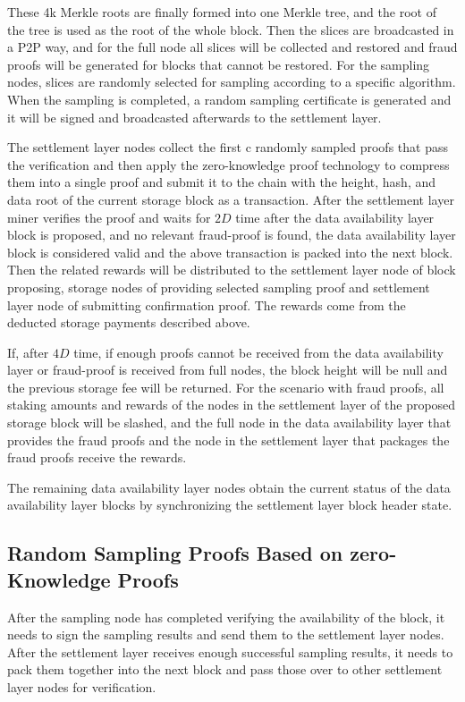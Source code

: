 \documentclass{iacrtrans}
\begin{document}
These 4k Merkle roots are finally formed into one Merkle tree, and the root of the tree is used as the root of the whole block. Then the slices are broadcasted in a P2P way, and for the full node all slices will be collected and restored and fraud proofs will be generated for blocks that cannot be restored. For the sampling nodes, slices are randomly selected for sampling according to a specific algorithm. When the sampling is completed, a random sampling certificate is generated and it will be signed and broadcasted afterwards to the settlement layer.

The settlement layer nodes collect the first c randomly sampled proofs that pass the verification and then apply the zero-knowledge proof technology to compress them into a single proof and submit it to the chain with the height, hash, and data root of the current storage block as a transaction. After the settlement layer miner verifies the proof and waits for $2D$ time after the data availability layer block is proposed, and no relevant fraud-proof is found, the data availability layer block is considered valid and the above transaction is packed into the next block. Then the related rewards will be distributed to the settlement layer node of block proposing, storage nodes of providing selected sampling proof and settlement layer node of submitting confirmation proof. The rewards come from the deducted storage payments described above. 

If, after $4D$ time, if enough proofs cannot be received from the data availability layer or fraud-proof is received from full nodes, the block height will be null and the previous storage fee will be returned. For the scenario with fraud proofs, all staking amounts and rewards of the nodes in the settlement layer of the proposed storage block will be slashed, and the full node in the data availability layer that provides the fraud proofs and the node in the settlement layer that packages the fraud proofs receive the rewards.

The remaining data availability layer nodes obtain the current status of the data availability layer blocks by synchronizing the settlement layer block header state.


\subsection{Random Sampling Proofs Based on zero-Knowledge Proofs}
After the sampling node has completed verifying the availability of the block, it needs to sign the sampling results and send them to the settlement layer nodes. After the settlement layer receives enough successful sampling results, it needs to pack them together into the next block and pass those over to other settlement layer nodes for verification.
\end{document}
